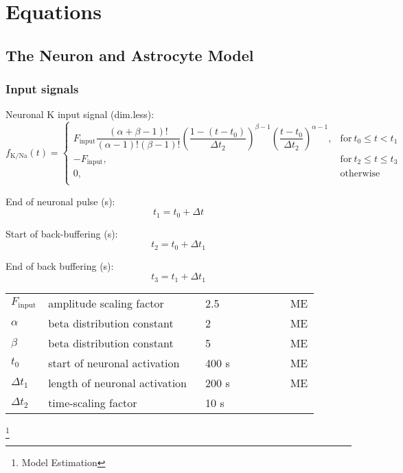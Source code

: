 \section{Equations}\label{sec:equations}

\subsection{The Neuron and Astrocyte Model}

\subsubsection*{Input signals} \label{sec:InputSignal}

Neuronal \gls{K} input signal (dim.less):
\begin{equation}
f_{\text{K/Na}}(t) = 
	\begin{cases} 
		F_{\text{input}} \dfrac{(\alpha + \beta-1)!}{(\alpha-1)!(\beta-1)!} \left( \dfrac{1-(t-t_{0})}{\Delta t_2}\right) ^{\beta -1} \left( \dfrac{t-t_{0}}{\Delta t_2}\right) ^{\alpha -1}, & \text{for}\: t_{0} \leq t < t_{1} \\
		-F_{\text{input}}, & \text{for}\: t_{2} \leq t \leq t_{3} \\	
		0, & \text{otherwise}\\	
	\end{cases} 
\end{equation}

End of neuronal pulse (s):
\begin{equation}
	t_{1} = t_{0} + \Delta t
\end{equation}

Start of back-buffering (s):
\begin{equation}
	t_{2} = t_{0} + \Delta t_1
\end{equation}

End of back buffering (s):
\begin{equation}
	t_{3} = t_{1} + \Delta t_1
\end{equation}


\begin{table}[h!]
\centering
\begin{tabular}{ p{0.09\linewidth}  >{\footnotesize} p{0.5\linewidth}  >{\footnotesize} p{0.27\linewidth} >{\footnotesize} p{0.03\linewidth} }
\hline
$F_{\text{input}}$ 		& amplitude scaling factor 		& 2.5 		& ME\footnotemark[1]  \\ %
$\alpha$ 				& beta distribution constant	& 2 		& ME  \\ %
$\beta$ 				& beta distribution constant	& 5 		& ME  \\ %
$t_{0}$ 				& start of neuronal activation	& 400 s 	& ME  \\
$\Delta t_1$ 			& length of neuronal activation & 200 s 	& ME  \\
$\Delta t_2$ 			& time-scaling factor			& 10 s		& \citep{Ostby2009}   \\
\hline
\end{tabular}
\end{table}
\footnote[1]{Model Estimation}

